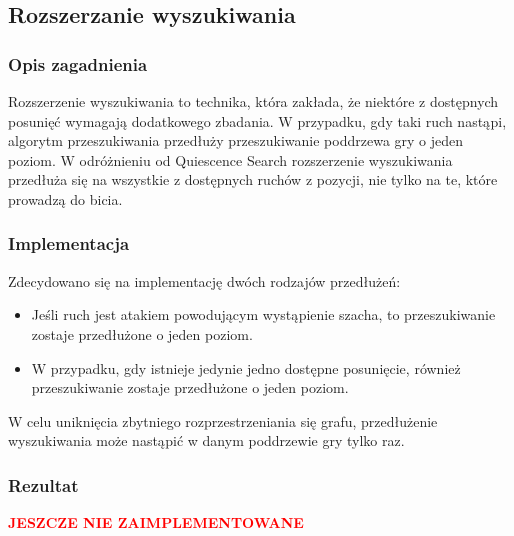 \subsection{Rozszerzanie wyszukiwania}
\label{subsec:rozszerzanie-wyszukiwania}

\subsubsection{Opis zagadnienia}
Rozszerzenie wyszukiwania to technika, która zakłada, że niektóre z dostępnych posunięć wymagają dodatkowego zbadania.
W przypadku, gdy taki ruch nastąpi, algorytm przeszukiwania przedłuży przeszukiwanie poddrzewa gry o jeden poziom.
W odróżnieniu od Quiescence Search rozszerzenie wyszukiwania przedłuża się na wszystkie z dostępnych ruchów z pozycji, nie tylko na te, które prowadzą do bicia.

\subsubsection{Implementacja}
Zdecydowano się na implementację dwóch rodzajów przedłużeń:
\begin{itemize}
    \item Jeśli ruch jest atakiem powodującym wystąpienie szacha, to przeszukiwanie zostaje przedłużone o jeden poziom.
    \item W przypadku, gdy istnieje jedynie jedno dostępne posunięcie, również przeszukiwanie zostaje przedłużone o jeden poziom.
\end{itemize}
W celu uniknięcia zbytniego rozprzestrzeniania się grafu, przedłużenie wyszukiwania może nastąpić w danym poddrzewie gry tylko raz.
\subsubsection{Rezultat}
\begin{center}
    \textcolor{red}{\textbf{JESZCZE NIE ZAIMPLEMENTOWANE}}
\end{center}